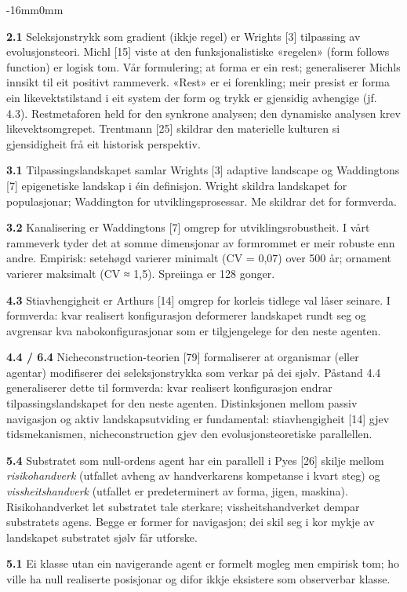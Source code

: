 \documentclass[10pt,oneside]{book}
\newcommand{\msym}[1]{{\mathfbfont #1}}
\newenvironment{widebody}{%
  \begin{adjustwidth}{-16mm}{0mm}%
}{%
  \end{adjustwidth}%
}
\begin{document}
\begin{widebody}
{\textbf{2.1} Seleksjonstrykk som gradient (ikkje regel) er Wrights [3] tilpassing av evolusjonsteori. Michl [15] viste at den funksjonalistiske «regelen» (form follows function) er logisk tom. Vår formulering; at forma er ein rest; generaliserer Michls innsikt til eit positivt rammeverk. «Rest» er ei forenkling; meir presist er forma ein likevektstilstand i eit system der form og trykk er gjensidig avhengige (jf. 4.3). Restmetaforen held for den synkrone analysen; den dynamiske analysen krev likevektsomgrepet. Trentmann [25] skildrar den materielle kulturen si gjensidigheit frå eit historisk perspektiv.

\textbf{3.1} Tilpassingslandskapet samlar Wrights [3] adaptive landscape og Waddingtons [7] epigenetiske landskap i éin definisjon. Wright skildra landskapet for populasjonar; Waddington for utviklingsprosessar. Me skildrar det for formverda.

\textbf{3.2} Kanalisering er Waddingtons [7] omgrep for utviklingsrobustheit. I vårt rammeverk tyder det at somme dimensjonar av formrommet er meir robuste enn andre. Empirisk: setehøgd varierer minimalt (CV = 0,07) over 500 år; ornament varierer maksimalt (CV \msym{≈} 1,5). Spreiinga er 128 gonger.

\textbf{4.3} Stiavhengigheit er Arthurs [14] omgrep for korleis tidlege val låser seinare. I formverda: kvar realisert konfigurasjon deformerer landskapet rundt seg og avgrensar kva nabokonfigurasjonar som er tilgjengelege for den neste agenten.

\textbf{4.4 / 6.4} Nicheconstruction-teorien [79] formaliserer at organismar (eller agentar) modifiserer dei seleksjonstrykka som verkar på dei sjølv. Påstand 4.4 generaliserer dette til formverda: kvar realisert konfigurasjon endrar tilpassingslandskapet for den neste agenten. Distinksjonen mellom passiv navigasjon og aktiv landskapsutviding er fundamental: stiavhengigheit [14] gjev tids\-mekanismen, nicheconstruction gjev den evolusjonsteoretiske parallellen.

\textbf{5.4} Substratet som null-ordens agent har ein parallell i Pyes [26] skilje mellom \textit{risikohandverk} (utfallet avheng av handverkarens kompetanse i kvart steg) og \textit{vissheitshandverk} (utfallet er predeterminert av forma, jigen, maskina). Risikohandverket let substratet tale sterkare; vissheitshandverket dempar substratets agens. Begge er former for navigasjon; dei skil seg i kor mykje av landskapet substratet sjølv får utforske.

\textbf{5.1} Ei klasse utan ein navigerande agent er formelt mogleg men empirisk tom; ho ville ha null realiserte posisjonar og difor ikkje eksistere som observerbar klasse.

}
\end{widebody}
\end{document}
